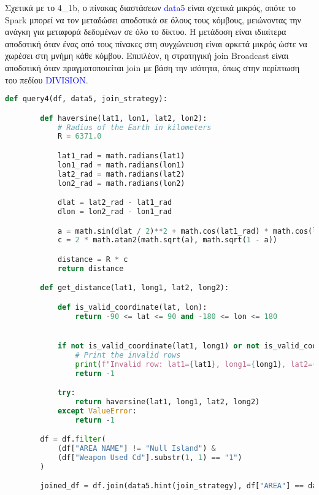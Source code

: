 \documentclass{article}
\begin{document}
\vspace{3mm}

Σχετικά με το 4\_1b, ο πίνακας διαστάσεων \textcolor{blue}{data5} είναι σχετικά μικρός, οπότε το 
Spark μπορεί να τον μεταδώσει αποδοτικά σε όλους τους κόμβους, μειώνοντας την ανάγκη για 
μεταφορά δεδομένων σε όλο το δίκτυο. Η μετάδοση είναι ιδιαίτερα αποδοτική όταν ένας από τους 
πίνακες στη συγχώνευση είναι αρκετά μικρός ώστε να χωρέσει στη μνήμη κάθε κόμβου. Επιπλέον, 
η στρατηγική join Broadcast είναι αποδοτική όταν πραγματοποιείται join με βάση την ισότητα, όπως στην περίπτωση του 
πεδίου \textcolor{blue}{DIVISION}.\\


\begin{lstlisting}[language = Python]
    def query4(df, data5, join_strategy):

        def haversine(lat1, lon1, lat2, lon2):
            # Radius of the Earth in kilometers
            R = 6371.0

            lat1_rad = math.radians(lat1)
            lon1_rad = math.radians(lon1)
            lat2_rad = math.radians(lat2)
            lon2_rad = math.radians(lon2)

            dlat = lat2_rad - lat1_rad
            dlon = lon2_rad - lon1_rad

            a = math.sin(dlat / 2)**2 + math.cos(lat1_rad) * math.cos(lat2_rad) * math.sin(dlon / 2)**2
            c = 2 * math.atan2(math.sqrt(a), math.sqrt(1 - a))

            distance = R * c
            return distance

        def get_distance(lat1, long1, lat2, long2):

            def is_valid_coordinate(lat, lon):
                return -90 <= lat <= 90 and -180 <= lon <= 180


            if not is_valid_coordinate(lat1, long1) or not is_valid_coordinate(lat2, long2):
                # Print the invalid rows
                print(f"Invalid row: lat1={lat1}, long1={long1}, lat2={lat2}, long2={long2}")
                return -1

            try:
                return haversine(lat1, long1, lat2, long2)
            except ValueError:
                return -1

        df = df.filter(
            (df["AREA NAME"] != "Null Island") &
            (df["Weapon Used Cd"].substr(1, 1) == "1")
        )

        joined_df = df.join(data5.hint(join_strategy), df["AREA"] == data5["PREC"])


\end{lstlisting}
\end{document}

